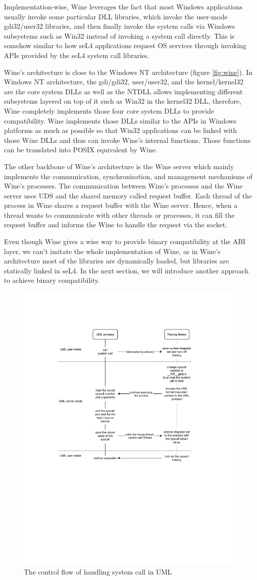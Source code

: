 Implementation-wise, Wine leverages the fact that most Windows applications usually invoke some particular DLL libraries, which invoke the user-mode gdi32/user32 libraries, and then finally invoke the system calls via Windows subsystems such as Win32 instead of invoking a system call directly. This is somehow similar to how seL4 applications request OS services through invoking APIs provided by the seL4 system call libraries. 

Wine's architecture is close to the Windows NT architecture (figure \ref{fig:wine}). In Windows NT architecture, the gdi/gdi32, user/user32, and the kernel/kernel32 are the core system DLLs as well as the NTDLL allows implementing different subsystems layered on top of it such as Win32 in the kernel32 DLL, therefore, Wine completely implements those four core system DLLs to provide compatibility. Wine implements those DLLs similar to the APIs in Windows platforms as much as possible so that Win32 applications can be linked with those Wine DLLs and thus can invoke Wine's internal functions. Those functions can be translated into POSIX equivalent by Wine.

The other backbone of Wine's architecture is the Wine server which mainly implements the communication, synchronisation, and management mechanisms of Wine's processes. The communication between Wine's processes and the Wine server uses UDS and the shared memory called request buffer. Each thread of the process in Wine shares a request buffer with the Wine server. Hence, when a thread wants to communicate with other threads or processes, it can fill the request buffer and informs the Wine to handle the request via the socket.

Even though Wine gives a wise way to provide binary compatibility at the ABI layer, we can't imitate the whole implementation of Wine, as in Wine's architecture most of the libraries are dynamically loaded, but libraries are statically linked in seL4. In the next section, we will introduce another approach to achieve binary compatibility.  

\begin{figure}[h]
    \centering
    \includegraphics[clip, trim=0.5cm 16cm 0.5cm 3cm, width=1.0\textwidth, height=0.7\textwidth]{ch2/UML-syscall.pdf}
    \caption{The control flow of handling system call in UML}
    \label{fig:uml-sys}
\end{figure}

